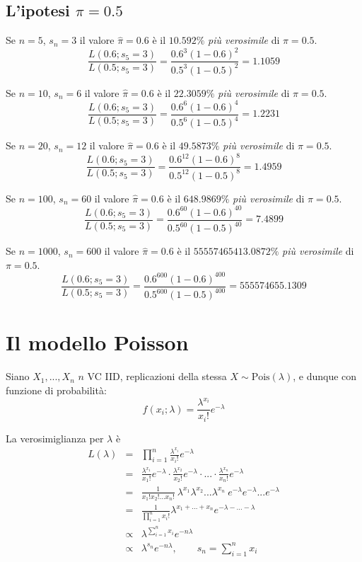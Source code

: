 \documentclass[
  11pt,
]{book}
\theoremstyle{mytheoremstyle}
\theoremstyle{mydefstyle}
\begin{document}
\subsection{\texorpdfstring{L'ipotesi \(\pi=0.5\)}{L'ipotesi \textbackslash pi=0.5}}\label{lipotesi-pi0.5}

Se \(n=5\), \(s_n=3\) il valore \(\hat\pi=0.6\) è il \(10.592\%\) \emph{più verosimile} di \(\pi=0.5\).
\[\frac{L(0.6;s_5=3)}{L(0.5;s_5=3)}=\frac{0.6^{3}(1-0.6)^{2}}{0.5^{3}(1-0.5)^{2}}=1.1059\]

Se \(n=10\), \(s_n=6\) il valore \(\hat\pi=0.6\) è il \(22.3059\%\) \emph{più verosimile} di \(\pi=0.5\).
\[\frac{L(0.6;s_5=3)}{L(0.5;s_5=3)}=\frac{0.6^{6}(1-0.6)^{4}}{0.5^{6}(1-0.5)^{4}}=1.2231\]

Se \(n=20\), \(s_n=12\) il valore \(\hat\pi=0.6\) è il \(49.5873\%\) \emph{più verosimile} di \(\pi=0.5\).
\[\frac{L(0.6;s_5=3)}{L(0.5;s_5=3)}=\frac{0.6^{12}(1-0.6)^{8}}{0.5^{12}(1-0.5)^{8}}=1.4959\]

Se \(n=100\), \(s_n=60\) il valore \(\hat\pi=0.6\) è il \(648.9869\%\) \emph{più verosimile} di \(\pi=0.5\).
\[\frac{L(0.6;s_5=3)}{L(0.5;s_5=3)}=\frac{0.6^{60}(1-0.6)^{40}}{0.5^{60}(1-0.5)^{40}}=7.4899\]

Se \(n=1000\), \(s_n=600\) il valore \(\hat\pi=0.6\) è il \(55557465413.0872\%\) \emph{più verosimile} di \(\pi=0.5\).
\[\frac{L(0.6;s_5=3)}{L(0.5;s_5=3)}=\frac{0.6^{600}(1-0.6)^{400}}{0.5^{600}(1-0.5)^{400}}=555574655.1309\]

\section{Il modello Poisson}\label{il-modello-poisson}

Siano \(X_1,...,X_n\) \(n\) VC IID, replicazioni della stessa \(X\sim\text{Pois}(\lambda)\), e dunque con funzione di probabilità:
\[f(x_i;\lambda)=\frac{\lambda^{x_i}}{x_i!}e^{-\lambda}\]

La verosimiglianza per \(\lambda\) è
\begin{eqnarray*}
  L(\lambda) &=& \prod_{i=1}^n\frac{\lambda^{x_i}}{x_i!}e^{-\lambda}\\
             &=& \frac{\lambda^{x_1}}{x_1!}e^{-\lambda}\cdot \frac{\lambda^{x_2}}{x_2!}e^{-\lambda}\cdot ...\cdot \frac{\lambda^{x_n}}{x_n!}e^{-\lambda}\\
             &=& \frac{1}{x_1!x_2!...x_n!} ~ \lambda^{x_1}\lambda^{x_2}...\lambda^{x_n} ~ e^{-\lambda}e^{-\lambda}...e^{-\lambda}\\
             &=& \frac{1}{\prod_{i=1}^n x_i!} \lambda^{x_1+...+x_n} e^{-\lambda-...-\lambda}\\
             &\propto& \lambda^{\sum_{i=1}^n x_i} e^{-n\lambda}\\
             &\propto& \lambda^{s_n} e^{-n\lambda},\qquad s_n=\sum_{i=1}^n x_i
\end{eqnarray*}
\end{document}
